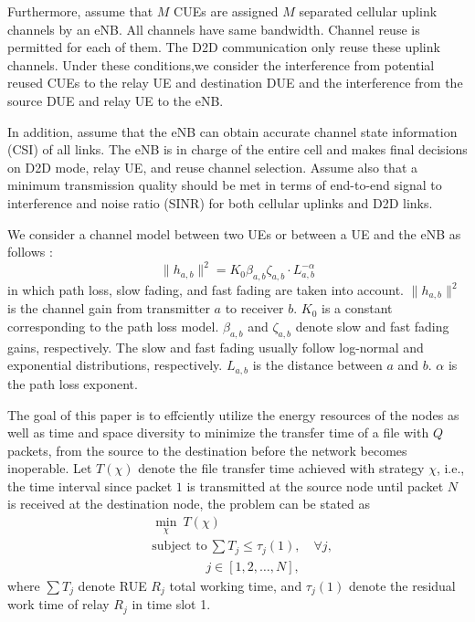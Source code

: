 \documentclass[conference]{IEEEtran}
\begin{document}
Furthermore, assume that $M$ CUEs are assigned $M$ separated cellular uplink channels by an eNB. All channels have same bandwidth. Channel reuse is permitted for each of them. The D2D communication only reuse these uplink channels. Under these conditions,we consider the interference from potential reused CUEs to the relay UE and destination DUE and the interference from the source DUE and relay UE to the eNB.

In addition, assume that the eNB can obtain accurate channel state information (CSI) of all links. The eNB is in charge of the entire cell and makes final decisions on D2D mode, relay UE, and reuse channel selection. Assume also that a minimum transmission quality should be met in terms of end-to-end signal to interference and noise ratio (SINR) for both cellular uplinks and D2D links.

We consider a channel model between two UEs or between a UE and the eNB as follows \cite{6560489} :
\begin{equation}
\|{h_{a,b}}\|^{2} = K_{0}\beta_{a,b}\zeta_{a,b}\cdot L_{a,b}^{-\alpha}
\end{equation}
in which path loss, slow fading, and fast fading are taken into account. $\|{h_{a,b}}\|^{2}$ is the channel gain from transmitter $a$ to receiver $b$. $K_{0}$ is a constant corresponding to the path loss model. $\beta_{a,b}$ and $\zeta_{a,b}$ denote slow and fast fading gains, respectively. The slow and fast fading usually follow log-normal and exponential distributions, respectively. $L_{a,b}$ is the distance between $a$ and $b$. $\alpha$ is the path loss exponent.

The goal of this paper is to effciently utilize the energy resources of the nodes as well as time and space diversity to minimize the transfer time of a file with $Q$ packets, from the source to the destination before the network becomes inoperable. Let $T\left(\chi\right)$ denote the file transfer time achieved with strategy $\chi$, i.e., the time interval since packet $1$ is transmitted at the source node until packet $N$ is received at the destination node, the problem can be stated as
\begin{align}
&\displaystyle \min _{\mathcal {\chi}} ~T(\mathcal {\chi})
\\[-5pt]&\text {subject to} ~ \sum T_{j} \leq \tau_j(1) , \quad \forall j , \tag{2a}
\\[-1.5pt]&\qquad \qquad ~ j\in\left[1,2,\ldots,N\right] , \tag{2b}
\end{align}
where $\sum T_{j}$ denote RUE $R_{j}$ total working time, and $ \tau_j(1)$ denote the residual work time of relay $R_j$ in time slot 1.
\end{document}
